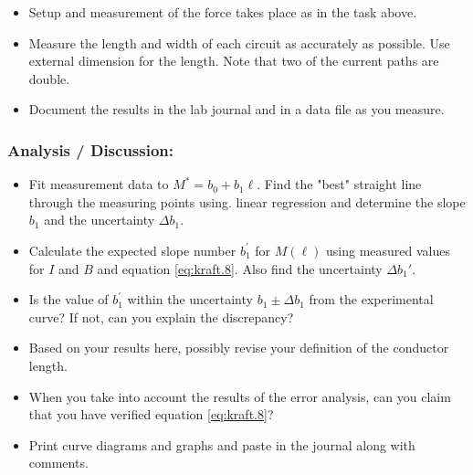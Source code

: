 \documentclass[../Elmag-labhefte-2020.tex]{subfiles}
\begin{document}
%
\begin{itemize}
    \item Setup and measurement of the force takes place as in the task above.
    \item Measure the length and width of each circuit as accurately as possible. Use external dimension for the length. Note that two of the current paths are double.
    \item Document the results in the lab journal and in a data file as you measure.
\end{itemize}

\subsubsection{Analysis / Discussion:}
\begin{itemize}
    \item Fit measurement data to $M^\ast = b_0 + b_1\ell$. Find the "best" straight line through the measuring points using. linear regression and determine the slope $b_1$ and the uncertainty $\Delta b_1$.
    \item Calculate the expected slope number $b_1^\prime$ for $M(\ell)$ using measured values   for $I$ and $B$ and equation \eqref{eq:kraft.8}. Also find the uncertainty $\Delta b_1'$.
    \item Is the value of $b_1^\prime$ within the uncertainty $b_1 \pm \Delta b_1$ from the experimental curve? If not, can you explain the discrepancy?
    \item Based on your results here, possibly revise your definition of the conductor length.
    \item When you take into account the results of the error analysis, can you claim that you have verified equation \eqref{eq:kraft.8}?
    \item Print curve diagrams and graphs and paste in the journal along with comments.
\end{itemize}
\end{document}
